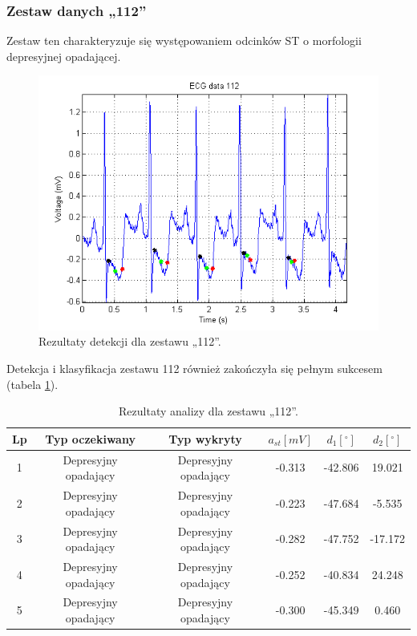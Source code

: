 \subsubsection*{Zestaw danych „112”}
Zestaw ten charakteryzuje się występowaniem odcinków ST o morfologii depresyjnej opadającej.
\begin{figure}[H]
	\centering
	\includegraphics[width=1\textwidth]{ST_INTERVAL/img/ST_zestaw112.png}
	\caption{Rezultaty detekcji dla zestawu „112”.}
	\label{fig:ST_zestaw112}
\end{figure}
Detekcja i klasyfikacja zestawu 112 również zakończyła się pełnym sukcesem (tabela \ref{tab:ST_zestaw112}).
\begin{table}[H]
	\centering
	\caption{Rezultaty analizy dla zestawu „112”.}
	\label{tab:ST_zestaw112}
	\begin{tabular}{|c|c|c|c|c|c|}
	\hline
	Lp & Typ oczekiwany & Typ wykryty & $ a_{st} [mV] $ & $ d_1 [^\circ] $ & $ d_2 [^\circ] $ \\ \hline
	1	&	Depresyjny opadający	&	Depresyjny opadający	&	-0.313	&	-42.806	&	19.021	\\ \hline
	2	&	Depresyjny opadający	&	Depresyjny opadający	&	-0.223	&	-47.684	&	-5.535	\\ \hline
	3	&	Depresyjny opadający	&	Depresyjny opadający	&	-0.282	&	-47.752	&	-17.172	\\ \hline
	4	&	Depresyjny opadający	&	Depresyjny opadający	&	-0.252	&	-40.834	&	24.248	\\ \hline
	5	&	Depresyjny opadający	&	Depresyjny opadający	&	-0.300	&	-45.349	&	0.460	\\ \hline
	\end{tabular}
\end{table}

